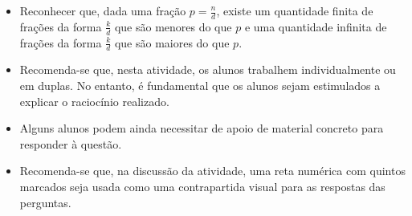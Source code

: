 \begin{multicols}{2}
\begin{solucao}{}{}
\begin{center}
\end{center}

 \end{solucao}


\begin{objetivos}[label=chap4-ativ12]{}{}
\begin{itemize} %
    \item       Reconhecer que, dada uma fração       $p = \frac{n}{d}$, existe
um quantidade finita de frações da forma       $\frac{k}{d}$       que são
menores do que       $p$       e uma quantidade infinita de frações da forma
  $\frac{k}{d}$       que são maiores do que       $p$.
\end{itemize} %
\end{objetivos}

\begin{orientacoes}{}{}

\begin{itemize} %
    \item       Recomenda-se que, nesta atividade, os alunos trabalhem
individualmente ou em duplas. No entanto, é fundamental que os alunos sejam
estimulados a explicar o raciocínio realizado.
    \item       Alguns alunos podem ainda necessitar de apoio de material
concreto para responder à questão.
    \item       Recomenda-se que, na discussão da atividade, uma reta numérica
com quintos marcados seja usada como uma contrapartida visual para as respostas
das perguntas.
\end{itemize} %


\noindent 
\begin{center}
\end{center}
\end{orientacoes}
\end{multicols}
